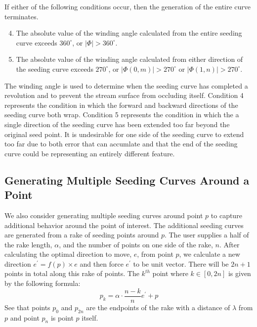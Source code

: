 \documentclass{vgtc}                          %
\begin{document}
If either of the following conditions occur, then the generation of the entire curve terminates.

\begin{enumerate}
\setcounter{enumi}{3}
\item{The absolute value of the winding angle calculated from the entire seeding curve exceeds $360^\circ$, or $\left|\Phi\right| > 360^\circ$.}
\item{The absolute value of the winding angle calculated from either direction of the seeding curve exceeds $270^\circ$, or $\left|\Phi(0, m)\right| > 270^\circ$ or $\left|\Phi(1, n)\right| > 270^\circ$.}
\end{enumerate}

The winding angle is used to determine when the seeding curve has completed a revolution and to prevent the stream surface from occluding itself.
Condition 4 represents the condition in which the forward and backward directions of the seeding curve both wrap.
Condition 5 represents the condition in which the a single direction of the seeding curve has been extended too far beyond the original seed point.
It is undesirable for one side of the seeding curve to extend too far due to both error that can accumlate and that the end of the seeding curve could be representing an entirely different feature.

\subsection{Generating Multiple Seeding Curves Around a Point}

We also consider generating multiple seeding curves around point $p$ to capture additional behavior around the point of interest.
The additional seeding curves are generated from a rake of seeding points around $p$.
The user supplies a half of the rake length, $\alpha$, and the number of points on one side of the rake, $n$.
After calculating the optimal direction to move, $e$, from point $p$, we calculate a new direction $e^\prime = f(p) \times e$ and then force $e^\prime$ to be unit vector.
There will be $2n + 1$ points in total along this rake of points.
The $k^{th}$ point where $k \in [0, 2n]$ is given by the following formula:
\begin{displaymath}
p_k = \alpha \cdot \frac{n - k}{n} e^\prime + p
\end{displaymath}
See that points $p_0$ and $p_{2n}$ are the endpoints of the rake with a distance of $\lambda$ from $p$ and point $p_n$ is point $p$ itself.
\end{document}
